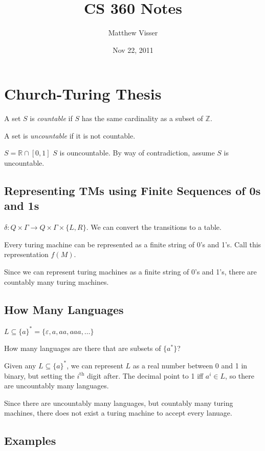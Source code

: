 \documentclass[12pt]{article}
\theoremstyle{definition}
\begin{document}
\title{CS 360 Notes}
\author{Matthew Visser}
\date{Nov 22, 2011}
\maketitle

\section{Church-Turing Thesis}

A set $S$ is \emph{countable} if $S$ has the same cardinality as a subset of
$\mathbb{Z}$.

A set is \emph{uncountable} if it is not countable.

$S = \mathbb{R} \cap [0,1]$ $S$ is ouncountable. By way of contradiction, assume
$S$ is uncountable.

\subsection{Representing TMs using Finite Sequences of 0s and 1s}

$\delta: Q \times \Gamma \to Q \times \Gamma \times \{L,R\}$. We can convert the
transitions to a table.

Every turing machine can be represented as a finite string of 0's and 1's. Call
this representation $f(M)$.

Since we can represent turing machines as a finite string of  0's and 1's, there
are countably many turing machines.

\subsection{How Many Languages}

$L \subseteq \{a\}^* = \{\varepsilon,a,aa,aaa,\dots\}$

How many languages are there that are subsets of $\{a^*\}$?

Given any $L \subseteq \{a\}^*$, we can represent $L$ as a real number between 0
and 1 in binary, but setting the $i^{\text{th}}$ digit after. The decimal point
to 1 iff $a^i \in L$, so there are uncountably many languages.

Since there are uncountably many languages, but countably many turing machines,
there does not exist a turing machine to accept every lanuage.

\subsection{Examples}
\end{document}
